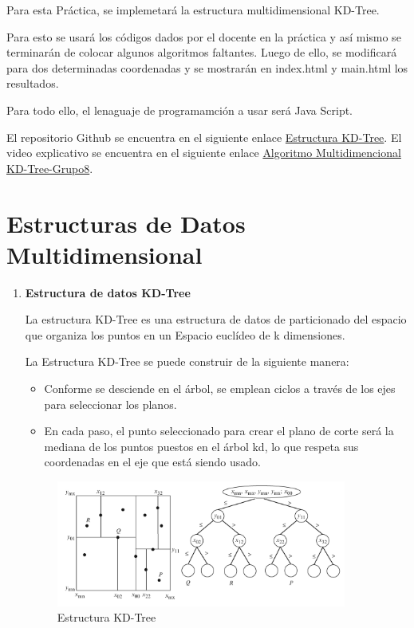 \documentclass{article}
\begin{document}
	Para esta Práctica, se implemetará la estructura multidimensional KD-Tree.

    Para esto se usará los códigos dados por el docente en la práctica y así mismo se terminarán de colocar algunos algoritmos faltantes. Luego de ello, se modificará para dos determinadas coordenadas y se mostrarán en index.html y main.html los resultados.

    Para todo ello, el lenaguaje de programamción a usar será Java Script.
	
El repositorio Github se encuentra en el siguiente enlace \href{https://github.com/nestorcal/kdtree}{Estructura KD-Tree}.
El video explicativo se encuentra en el siguiente enlace \href{https://github.com/nestorcal/kdtree}{Algoritmo Multidimencional KD-Tree-Grupo8}.
	
	\section{Estructuras de Datos Multidimensional}\label{sec:ejercicios}
	\begin{enumerate}
		\item \textbf{Estructura de datos KD-Tree}
		
			La estructura KD-Tree es una estructura de datos de particionado del espacio que organiza los puntos en un Espacio euclídeo de k dimensiones.

La Estructura KD-Tree se puede construir de la siguiente manera: 

\begin{itemize}
   \item Conforme se desciende en el árbol, se emplean ciclos a través de los ejes para seleccionar los planos.
   \item En cada paso, el punto seleccionado para crear el plano de corte será la mediana de los puntos puestos en el árbol kd, lo que respeta sus coordenadas en el eje que está siendo usado.

\end{itemize}	

\begin{figure}[H]
\centering
\includegraphics[width=0.9\textwidth]{Img/KD-Tree.png}
\caption{Estructura KD-Tree}
\end{figure}

\end{enumerate}
\end{document}
